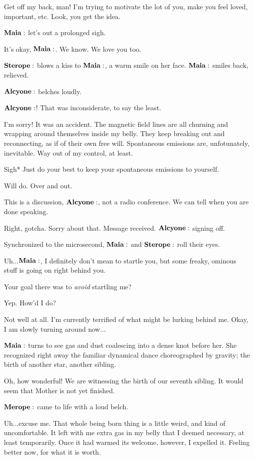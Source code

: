 \Maia Get off my back, man!  I'm trying to motivate the lot of you, make you feel loved, important, etc.  Look, you get the idea. 

$\Maia$ let's out a prolonged sigh.

\Sterope It's okay, $\Maia$.  We know.  We love you too.

$\Sterope$ blows a kiss to $\Maia$, a warm smile on her face.  $\Maia$ smiles back, relieved.

$\Alcyone$ belches loudly.

\Sterope $\Alcyone$!  That was inconsiderate, to say the least.

\Alcyone I'm sorry!  It was an accident.  The magnetic field lines are all churning and wrapping around themselves inside my belly.  They keep breaking out and reconnecting, as if of their own free will.  Spontaneous emissions are, unfotunately, inevitable.  Way out of my control, at least.

\Maia *Sigh*  Just do your best to keep your spontaneous emissions to yourself.

\Alcyone Will do.  Over and out.

\Maia This is a discussion, $\Alcyone$, not a radio conference.  We can tell when you are done speaking.

\Alcyone Right, gotcha.  Sorry about that. Message received.  $\Alcyone$ signing off.

Synchronized to the microsecond, $\Maia$ and $\Sterope$ roll their eyes.

\Electra Uh...$\Maia$, I definitely don't mean to startle you, but some freaky, ominous stuff is going on right behind you.

\Maia Your goal there was to \textit{avoid} startling me?

\Electra Yep.  How'd I do?

\Maia Not well at all.  I'm currently terrified of what might be lurking behind me.  Okay, I am slowly turning around now...

$\Maia$ turns to see gas and dust coalescing into a dense knot before her.  She recognized right away the familiar dynamical dance choreographed by gravity; the birth of another star, another sibling.

\Maia Oh, how wonderful!  We are witnessing the birth of our seventh sibling.  It would seem that Mother is not yet finished.

$\Merope$ came to life with a loud belch.

\Merope Uh...excuse me.  That whole being born thing is a little weird, and kind of uncomfortable.  It left with me extra gas in my belly that I deemed necessary, at least temporarily.  Once it had warmed its welcome, however, I expelled it.  Feeling better now, for what it is worth.  

